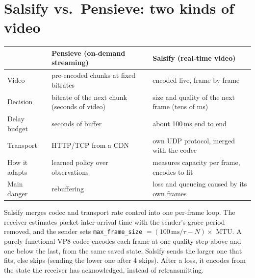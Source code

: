 \section{Salsify vs.\ Pensieve: two kinds of video}
\begin{center}
\begin{tabularx}{\linewidth}{@{}lXX@{}}
\toprule
 & \textbf{Pensieve (on-demand streaming)} & \textbf{Salsify (real-time video)}\\
\midrule
Video & pre-encoded chunks at fixed bitrates & encoded live, frame by frame\\
Decision & bitrate of the next chunk (seconds of video) & size and quality of the next frame (tens of ms)\\
Delay budget & seconds of buffer & about 100\,ms end to end\\
Transport & HTTP/TCP from a CDN & own UDP protocol, merged with the codec\\
How it adapts & learned policy over observations & measures capacity per frame, encodes to fit\\
Main danger & rebuffering & loss and queueing caused by its own frames\\
\bottomrule
\end{tabularx}
\end{center}

\begin{keybox}
Salsify merges codec and transport rate control into one per-frame loop. The receiver estimates packet inter-arrival time with the sender's grace period
removed, and the sender sets \texttt{max\_frame\_size} $= (100\,\text{ms}/\tau - N) \times$ MTU. A purely functional VP8 codec encodes each frame at
one quality step above and one below the last, from the same saved state; Salsify sends the larger one that fits, else skips (sending the lower one after
4 skips). After a loss, it encodes from the state the receiver has acknowledged, instead of retransmitting.
\end{keybox}

